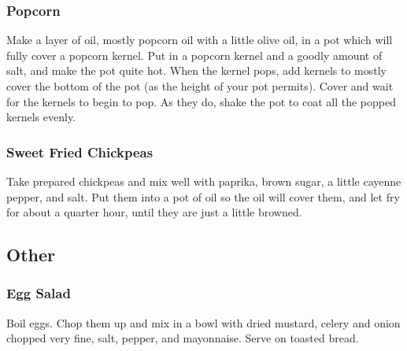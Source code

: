 \documentclass[10pt]{article}
\begin{document}
\subsubsection*{Popcorn}

Make a layer of oil, mostly popcorn oil with a little olive oil, in a pot which will fully cover a popcorn kernel.
Put in a popcorn kernel and a goodly amount of salt, and make the pot quite hot.
When the kernel pops, add kernels to mostly cover the bottom of the pot (as the height of your pot permits).
Cover and wait for the kernels to begin to pop.
As they do, shake the pot to coat all the popped kernels evenly.

\subsubsection*{Sweet Fried Chickpeas}

Take prepared chickpeas and mix well with paprika, brown sugar, a little cayenne pepper, and salt.
Put them into a pot of oil so the oil will cover them, and let fry for about a quarter hour, until they are just a little browned.

\subsection*{Other}

\subsubsection*{Egg Salad}

Boil eggs.
Chop them up and mix in a bowl with dried mustard, celery and onion chopped very fine, salt, pepper, and mayonnaise.
Serve on toasted bread.
\end{document}
